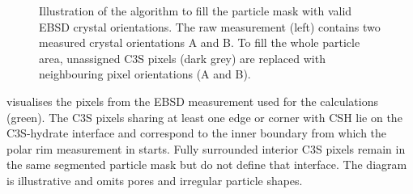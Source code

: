 \begin{figure}[htb]

    \caption{
        Illustration of the algorithm to fill the particle mask with valid \ac{EBSD} crystal orientations.
        The raw measurement (left) contains two measured crystal orientations {\color{darkred}A} and {\color{blue}B}.
        To fill the whole particle area, unassigned \ac{C3S} pixels (dark grey) are replaced with neighbouring pixel orientations ({\color{red}A} and {\color{cyan}B}).
    }
    \label{fig:clinker-ebsd-fill}
\end{figure}

 visualises the pixels from the \ac{EBSD} measurement used for the calculations (green).
The \ac{C3S} pixels sharing at least one edge or corner with \ac{CSH} lie on the \ac{C3S}-hydrate interface and correspond to the inner boundary from which the polar rim measurement in  starts.
Fully surrounded interior \ac{C3S} pixels remain in the same segmented particle mask but do not define that interface.
The diagram is illustrative and omits pores and irregular particle shapes.

